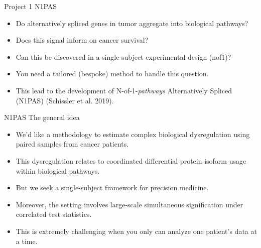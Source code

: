 \documentclass[ignorenonframetext,aspectratio=169,]{beamer}
\begin{document}
\begin{frame}{%
\protect\hypertarget{project-1-n1pas}{%
Project 1 N1PAS}}

\begin{itemize}
\item
  Do alternatively spliced genes in tumor aggregate into biological
  pathways?
\item
  Does this signal inform on cancer survival?
\item
  Can this be discovered in a single-subject experimental design (nof1)?
\item
  You need a tailored (bespoke) method to handle this question.
\item
  This lead to the development of N-of-1-\emph{pathways} Alternatively
  Spliced (N1PAS) (Schissler et al. 2019).
\end{itemize}

\end{frame}

\begin{frame}{%
\protect\hypertarget{n1pas-the-general-idea}{%
N1PAS The general idea}}

\begin{itemize}
        \setlength\itemsep{1em}
\item We'd like a methodology to estimate complex biological dysregulation using paired samples from cancer patients.
\item This dysregulation relates to coordinated differential protein isoform usage within biological pathways.
\item But we seek a single-subject framework for precision medicine.
\item Moreover, the setting involves large-scale simultaneous signification under correlated test statistics.
  \item This is extremely challenging when you only can analyze one patient's data at a time.
\end{itemize}

\end{frame}
\end{document}
